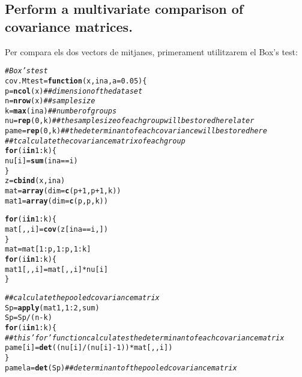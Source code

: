 \documentclass[a4paper,titlepage,12pt]{article}\usepackage[]{graphicx}\usepackage[]{color}
\makeatletter
\newcommand{\hlnum}[1]{\textcolor[rgb]{0.686,0.059,0.569}{#1}}%
\newcommand{\hlcom}[1]{\textcolor[rgb]{0.678,0.584,0.686}{\textit{#1}}}%
\newcommand{\hlopt}[1]{\textcolor[rgb]{0,0,0}{#1}}%
\newcommand{\hlstd}[1]{\textcolor[rgb]{0.345,0.345,0.345}{#1}}%
\newcommand{\hlkwa}[1]{\textcolor[rgb]{0.161,0.373,0.58}{\textbf{#1}}}%
\newcommand{\hlkwb}[1]{\textcolor[rgb]{0.69,0.353,0.396}{#1}}%
\newcommand{\hlkwc}[1]{\textcolor[rgb]{0.333,0.667,0.333}{#1}}%
\newcommand{\hlkwd}[1]{\textcolor[rgb]{0.737,0.353,0.396}{\textbf{#1}}}%
\newenvironment{kframe}{%
 \def\at@end@of@kframe{}%
 \ifinner\ifhmode%
  \def\at@end@of@kframe{\end{minipage}}%
  \begin{minipage}{\columnwidth}%
 \fi\fi%
 \def\FrameCommand##1{\hskip\@totalleftmargin \hskip-\fboxsep
 \colorbox{shadecolor}{##1}\hskip-\fboxsep
     \hskip-\linewidth \hskip-\@totalleftmargin \hskip\columnwidth}%
 \MakeFramed {\advance\hsize-\width
   \@totalleftmargin\z@ \linewidth\hsize
   \@setminipage}}%
 {\par\unskip\endMakeFramed%
 \at@end@of@kframe}
\newenvironment{knitrout}{}{} %
\makeatother
\begin{document}
\subsection{Perform a multivariate comparison of covariance matrices.}
Per compara els dos vectors de mitjanes, primerament utilitzarem el Box's test:
\begin{knitrout}
\color{fgcolor}\begin{kframe}
\begin{alltt}
\hlcom{# Box's test}
\hlstd{cov.Mtest} \hlkwb{=} \hlkwa{function}\hlstd{(}\hlkwc{x}\hlstd{,} \hlkwc{ina}\hlstd{,} \hlkwc{a} \hlstd{=} \hlnum{0.05}\hlstd{) \{}
    \hlstd{p} \hlkwb{=} \hlkwd{ncol}\hlstd{(x)}  \hlcom{## dimension of the data set}
    \hlstd{n} \hlkwb{=} \hlkwd{nrow}\hlstd{(x)}  \hlcom{## sample size}
    \hlstd{k} \hlkwb{=} \hlkwd{max}\hlstd{(ina)}  \hlcom{## number of groups}
    \hlstd{nu} \hlkwb{=} \hlkwd{rep}\hlstd{(}\hlnum{0}\hlstd{, k)}  \hlcom{## the sample size of each group will be stored here later}
    \hlstd{pame} \hlkwb{=} \hlkwd{rep}\hlstd{(}\hlnum{0}\hlstd{, k)}  \hlcom{## the determinant of each covariance will be stored here}
    \hlcom{## t calculate the covariance matrix of each group}
    \hlkwa{for} \hlstd{(i} \hlkwa{in} \hlnum{1}\hlopt{:}\hlstd{k) \{}
        \hlstd{nu[i]} \hlkwb{=} \hlkwd{sum}\hlstd{(ina} \hlopt{==} \hlstd{i)}
    \hlstd{\}}
    \hlstd{z} \hlkwb{=} \hlkwd{cbind}\hlstd{(x, ina)}
    \hlstd{mat} \hlkwb{=} \hlkwd{array}\hlstd{(}\hlkwc{dim} \hlstd{=} \hlkwd{c}\hlstd{(p} \hlopt{+} \hlnum{1}\hlstd{, p} \hlopt{+} \hlnum{1}\hlstd{, k))}
    \hlstd{mat1} \hlkwb{=} \hlkwd{array}\hlstd{(}\hlkwc{dim} \hlstd{=} \hlkwd{c}\hlstd{(p, p, k))}

    \hlkwa{for} \hlstd{(i} \hlkwa{in} \hlnum{1}\hlopt{:}\hlstd{k) \{}
        \hlstd{mat[, , i]} \hlkwb{=} \hlkwd{cov}\hlstd{(z[ina} \hlopt{==} \hlstd{i, ])}
    \hlstd{\}}
    \hlstd{mat} \hlkwb{=} \hlstd{mat[}\hlnum{1}\hlopt{:}\hlstd{p,} \hlnum{1}\hlopt{:}\hlstd{p,} \hlnum{1}\hlopt{:}\hlstd{k]}
    \hlkwa{for} \hlstd{(i} \hlkwa{in} \hlnum{1}\hlopt{:}\hlstd{k) \{}
        \hlstd{mat1[, , i]} \hlkwb{=} \hlstd{mat[, , i]} \hlopt{*} \hlstd{nu[i]}
    \hlstd{\}}

    \hlcom{## calculate the pooled covariance matrix}
    \hlstd{Sp} \hlkwb{=} \hlkwd{apply}\hlstd{(mat1,} \hlnum{1}\hlopt{:}\hlnum{2}\hlstd{, sum)}
    \hlstd{Sp} \hlkwb{=} \hlstd{Sp}\hlopt{/}\hlstd{(n} \hlopt{-} \hlstd{k)}
    \hlkwa{for} \hlstd{(i} \hlkwa{in} \hlnum{1}\hlopt{:}\hlstd{k) \{}
        \hlcom{## this 'for' function calculates the determinant of each covariance matrix}
        \hlstd{pame[i]} \hlkwb{=} \hlkwd{det}\hlstd{((nu[i]}\hlopt{/}\hlstd{(nu[i]} \hlopt{-} \hlnum{1}\hlstd{))} \hlopt{*} \hlstd{mat[, , i])}
    \hlstd{\}}
    \hlstd{pamela} \hlkwb{=} \hlkwd{det}\hlstd{(Sp)}  \hlcom{## determinant of the pooled covariance matrix}


\end{alltt}
\end{kframe}
\end{knitrout}
\end{document}
